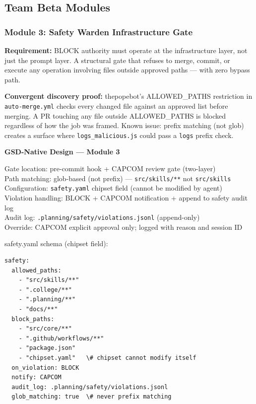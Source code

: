 \documentclass[11pt,letterpaper]{article}
\begin{document}
\subsection{Team Beta Modules}

\subsubsection{Module 3: Safety Warden Infrastructure Gate}

\textbf{Requirement:} BLOCK authority must operate at the infrastructure layer, not just the prompt layer. A structural gate that refuses to merge, commit, or execute any operation involving files outside approved paths --- with zero bypass path.

\textbf{Convergent discovery proof:} thepopebot's ALLOWED\_PATHS restriction in \texttt{auto-merge.yml} checks every changed file against an approved list before merging. A PR touching any file outside ALLOWED\_PATHS is blocked regardless of how the job was framed. Known issue: prefix matching (not glob) creates a surface where \texttt{logs\_malicious.js} could pass a \texttt{logs} prefix check.

\begin{implbox}
\textbf{GSD-Native Design --- Module 3}

Gate location: pre-commit hook + CAPCOM review gate (two-layer)\\
Path matching: glob-based (not prefix) --- \texttt{src/skills/**} not \texttt{src/skills}\\
Configuration: \texttt{safety.yaml} chipset field (cannot be modified by agent)\\
Violation handling: BLOCK + CAPCOM notification + append to safety audit log\\
Audit log: \texttt{.planning/safety/violations.jsonl} (append-only)\\
Override: CAPCOM explicit approval only; logged with reason and session ID

safety.yaml schema (chipset field):
\begin{verbatim}
safety:
  allowed_paths:
    - "src/skills/**"
    - ".college/**"
    - ".planning/**"
    - "docs/**"
  block_paths:
    - "src/core/**"
    - ".github/workflows/**"
    - "package.json"
    - "chipset.yaml"   \# chipset cannot modify itself
  on_violation: BLOCK
  notify: CAPCOM
  audit_log: .planning/safety/violations.jsonl
  glob_matching: true  \# never prefix matching
\end{verbatim}
\end{implbox}
\end{document}
